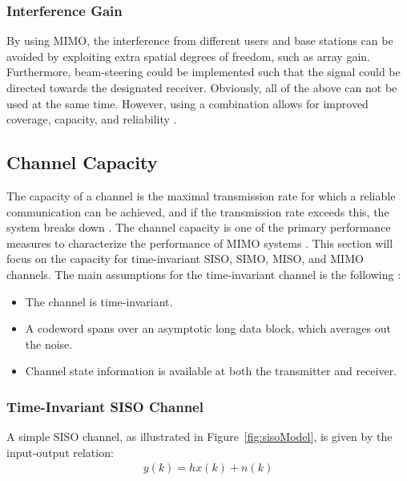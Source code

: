 \subsubsection{Interference Gain}
By using MIMO, the interference from different users and base stations can be avoided by exploiting extra spatial degrees of freedom, such as array gain. Furthermore, beam-steering could be implemented such that the signal could be directed towards the designated receiver. Obviously, all of the above can not be used at the same time. However, using a combination allows for improved coverage, capacity, and reliability \cite{Tim2012Practical}.

\subsection{Channel Capacity}
\def\snr{\text{SNR}_{\text{AWGN}}}
\def\PP{\overline{P}}
\def\CC{C_{\text{AWGN}}}

The capacity of a channel is the maximal transmission rate for which a reliable communication can be achieved, and if the transmission rate exceeds this, the system breaks down \cite{Tim2012Practical}. The channel capacity is one of the primary performance measures to characterize the performance of MIMO systems \cite{Tim2012Practical}. This section will focus on the capacity for time-invariant SISO, SIMO, MISO, and MIMO channels. The main assumptions for the time-invariant channel is the following \cite{Tim2012Practical}: 
\begin{itemize}
\item The channel is time-invariant.
\item A codeword spans over an asymptotic long data block, which averages out the noise.
\item Channel state information is available at both the transmitter and receiver. 
\end{itemize}

\subsubsection{Time-Invariant SISO Channel}
A simple SISO channel, as illustrated in Figure~\ref{fig:sisoModel}, is given by the input-output relation:
\begin{align*} %
  y(k) = h x(k) + n(k)
\end{align*}

